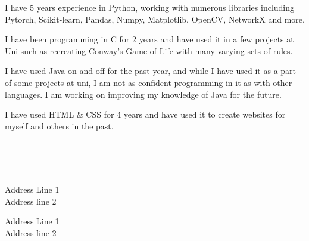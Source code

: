 \documentclass[10pt,a4paper,ragged2e,withhyper]{altacv}
\begin{document}
\begin{paracol}{2}
\switchcolumn


I have 5 years experience in Python, working with numerous libraries including Pytorch, Scikit-learn, Pandas, Numpy, Matplotlib, OpenCV, NetworkX and more.

\medskip

I have been programming in C for 2 years and have used it in a few projects at Uni such as recreating Conway's Game of Life with many varying sets of rules.

\medskip

I have used Java on and off for the past year, and while I have used it as a part of some projects at uni, I am not as confident programming in it as with other languages. I am working on improving my knowledge of Java for the future.

\medskip

I have used HTML \& CSS for 4 years and have used it to create websites for myself and others in the past.

\medskip




\\
\\
\\




{Address Line 1\\Address line 2}

\divider

{Address Line 1\\Address line 2}


\end{paracol}
\end{document}
